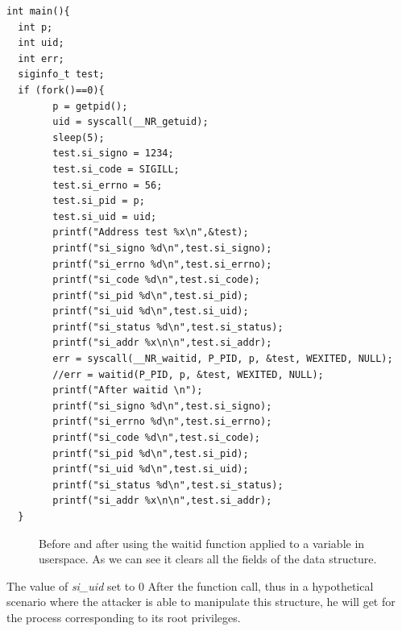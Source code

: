 \documentclass{masterthesis}
\newcommand{\vtnote}[1]{\todo[color=green!20]{#1}}
\begin{document}
\begin{lstlisting}
int main(){
  int p;
  int uid;
  int err;
  siginfo_t test;
  if (fork()==0){
        p = getpid();
        uid = syscall(__NR_getuid);
        sleep(5);
        test.si_signo = 1234;
        test.si_code = SIGILL;
        test.si_errno = 56;
        test.si_pid = p;
        test.si_uid = uid;
        printf("Address test %x\n",&test);
        printf("si_signo %d\n",test.si_signo);
        printf("si_errno %d\n",test.si_errno);
        printf("si_code %d\n",test.si_code);
        printf("si_pid %d\n",test.si_pid);
        printf("si_uid %d\n",test.si_uid);
        printf("si_status %d\n",test.si_status);
        printf("si_addr %x\n\n",test.si_addr);
        err = syscall(__NR_waitid, P_PID, p, &test, WEXITED, NULL);
        //err = waitid(P_PID, p, &test, WEXITED, NULL);
        printf("After waitid \n");
        printf("si_signo %d\n",test.si_signo);
        printf("si_errno %d\n",test.si_errno);
        printf("si_code %d\n",test.si_code);
        printf("si_pid %d\n",test.si_pid);
        printf("si_uid %d\n",test.si_uid);
        printf("si_status %d\n",test.si_status);
        printf("si_addr %x\n\n",test.si_addr);
  }
\end{lstlisting}
\begin{figure}[h!]
\caption{Before and after using the waitid function applied to a variable in userspace. As we can see it clears all the fields of the data structure.}
   \label{waitid_show}
\end{figure} 

The value of \textit{si\_uid} set to 0 \vtnote{use 0 or zero?} After the function call, thus in a hypothetical scenario where the attacker is able to manipulate this structure, he will get for the process corresponding to its root privileges.
\end{document}

